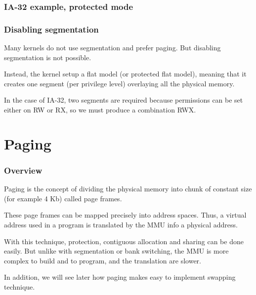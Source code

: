 
\begin{frame}
  \frametitle{IA-32 example, protected mode}

  \begin{center}
  \end{center}

\end{frame}


\begin{frame}
  \frametitle{Disabling segmentation}

  Many kernels do not use segmentation and prefer paging. But
  disabling segmentation is not possible.

  \-

  Instead, the kernel setup a flat model (or protected flat model),
  meaning that it creates one segment (per privilege level) overlaying
  all the physical memory.

  \-

  In the case of IA-32, two segments are required because permissions
  can be set either on RW or RX, so we must produce a combination RWX.

\end{frame}

%
%

\section{Paging}


\begin{frame}
  \frametitle{Overview}

  Paging is the concept of dividing the physical memory into chunk of
  constant size (for example 4 Kb) called page frames.

  \-

  These page frames can be mapped precisely into address spaces. Thus,
  a virtual address used in a program is translated by the MMU info a
  physical address.

  \-

  With this technique, protection, contiguous allocation and sharing
  can be done easily. But unlike with segmentation or bank switching,
  the MMU is more complex to build and to program, and the translation
  are slower.

  \-

  In addition, we will see later how paging makes easy to implement
  swapping technique.

\end{frame}

